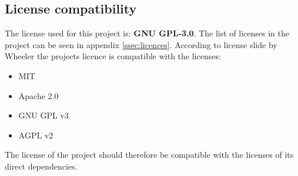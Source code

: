 \subsection{License compatibility}
The license used for this project is: \textbf{GNU GPL-3.0}. The list of licenses in the project can be seen in appendix \ref{ssec:licences}. According to license slide by Wheeler\cite{LicenseComp} the projects licence is compatible with the licenses: 
\begin{itemize}
    \item MIT
    \item Apache 2.0
    \item GNU GPL v3
    \item AGPL v2 
\end{itemize}
The license of the project should therefore be compatible with the licenses of its direct dependencies.
